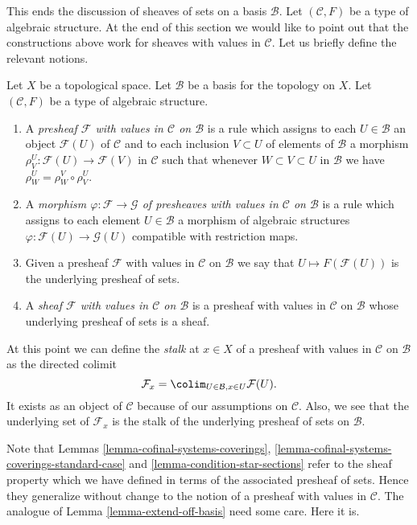 \noindent
This ends the discussion of sheaves of sets on
a basis $\mathcal{B}$. Let $(\mathcal{C}, F)$ be
a type of algebraic structure. At the end of this section
we would like to point out that the constructions
above work for sheaves with values in $\mathcal{C}$.
Let us briefly define the relevant notions.

\begin{definition}
\label{definition-sheaf-structures-basis}
Let $X$ be a topological space. Let $\mathcal{B}$ be a
basis for the topology on $X$. Let $(\mathcal{C}, F)$ be
a type of algebraic structure.
\begin{enumerate}
\item A {\it presheaf $\mathcal{F}$ with values in $\mathcal{C}$
on $\mathcal{B}$} is a rule which assigns to each
$U \in \mathcal{B}$ an object
$\mathcal{F}(U)$ of $\mathcal{C}$ and to each inclusion $V \subset U$
of elements of $\mathcal{B}$ a morphism
$\rho^U_V : \mathcal{F}(U) \to \mathcal{F}(V)$  in $\mathcal{C}$ such that
whenever $W \subset V \subset U$ in $\mathcal{B}$ we have
$\rho^U_W = \rho^V_W \circ \rho ^U_V$.
\item A {\it morphism $\varphi : \mathcal{F} \to \mathcal{G}$
of presheaves with values in $\mathcal{C}$
on $\mathcal{B}$} is a rule which assigns to each
element $U \in \mathcal{B}$ a morphism of
algebraic structures $\varphi : \mathcal{F}(U) \to \mathcal{G}(U)$
compatible with restriction maps.
\item Given a presheaf $\mathcal{F}$ with values in $\mathcal{C}$
on $\mathcal{B}$ we say that $U \mapsto F(\mathcal{F}(U))$ is the
underlying presheaf of sets.
\item A {\it sheaf $\mathcal{F}$ with values in $\mathcal{C}$
on $\mathcal{B}$} is a presheaf with values in $\mathcal{C}$
on $\mathcal{B}$ whose underlying presheaf of sets is a sheaf.
\end{enumerate}
\end{definition}

\noindent
At this point we can define the {\it stalk} at $x \in X$
of a presheaf with values in $\mathcal{C}$ on $\mathcal{B}$
as the directed colimit
$$
\mathcal{F}_x = \colim_{U\in \mathcal{B}, x\in U} \mathcal{F}(U).
$$
It exists as an object of $\mathcal{C}$
because of our assumptions on $\mathcal{C}$.
Also, we see that the underlying set of $\mathcal{F}_x$
is the stalk of the underlying presheaf of sets on $\mathcal{B}$.

\medskip\noindent
Note that Lemmas \ref{lemma-cofinal-systems-coverings},
\ref{lemma-cofinal-systems-coverings-standard-case} and
\ref{lemma-condition-star-sections} refer to the sheaf
property which we have defined in terms of the associated presheaf
of sets. Hence they generalize without change to the notion
of a presheaf with values in $\mathcal{C}$. The analogue of
Lemma \ref{lemma-extend-off-basis} need some care. Here it is.

